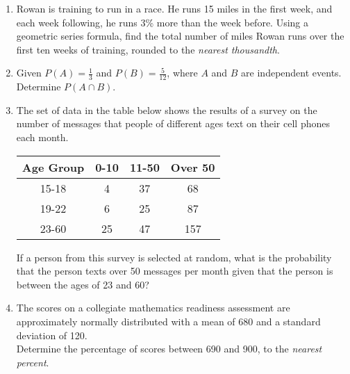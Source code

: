 \documentclass[12pt, twoside]{article}
\begin{document}
\begin{enumerate}
\item Rowan is training to run in a race. He runs 15 miles in the first week, and each week following, he runs 3\% more than the week before. Using a geometric series formula, find the total number of miles Rowan runs over the first ten weeks of training, rounded to the \emph{nearest thousandth}. %

\newpage
\item Given $P(A) = \frac{1}{3}$ and $P(B) = \frac{5}{12}$, where $A$ and $B$ are independent events. Determine $P(A \cap B)$. \vspace{3cm}

\item The set of data in the table below shows the results of a survey on the number of messages that people of different ages text on their cell phones each month.
\begin{center}
    \begin{tabular}{|c|c|c|c|}
        \hline
        Age Group & 0-10 & 11-50 & Over 50 \\
        \hline
        15-18 & 4 & 37 & 68 \\[0.25cm]
        \hline
        19-22 & 6 & 25 & 87 \\[0.25cm]
        \hline
        23-60 & 25 & 47 & 157 \\[0.25cm]
        \hline
    \end{tabular}
\end{center}
If a person from this survey is selected at random, what is the probability that the person texts over 50 messages per month given that the person is between the ages of 23 and 60?  \vspace{4cm}

\item The scores on a collegiate mathematics readiness assessment are approximately normally distributed with a mean of 680 and a standard deviation of 120.\\[0.5cm]
Determine the percentage of scores between 690 and 900, to the \emph{nearest percent}.\vspace{3cm}




\end{enumerate}
\end{document}
